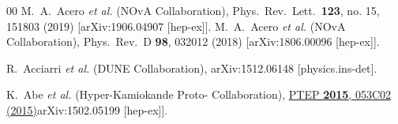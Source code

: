 \documentclass[aps,prl,twocolumn,superscriptaddress,nofootinbib]{revtex4}
\newcommand{\phref}[2]{\href{#2}{#1}}
\begin{document}
\begin{thebibliography}{00}
%
%
  M.~A.~Acero {\it et al.} (NOvA Collaboration),
  Phys.\ Rev.\ Lett.\  {\bf 123}, no. 15, 151803 (2019)
  [arXiv:1906.04907 [hep-ex]].
  M.~A.~Acero {\it et al.} (NOvA Collaboration),
  Phys.\ Rev.\ D {\bf 98}, 032012 (2018)
  [arXiv:1806.00096 [hep-ex]].

  R.~Acciarri {\it et al.} (DUNE Collaboration),
  arXiv:1512.06148 [physics.ins-det].

  K.~Abe {\it et al.} (Hyper-Kamiokande Proto- Collaboration),
   \phref{PTEP {\bf 2015}, 053C02 (2015)}
  [arXiv:1502.05199 [hep-ex]].



\end{thebibliography}
\end{document}
